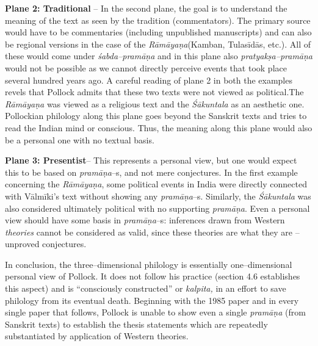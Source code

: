 \textbf{Plane 2: Traditional} – In the second plane, the goal is to understand the meaning of the text as seen by the tradition (commentators). The primary source would have to be commentaries (including unpublished manuscripts) and can also be regional versions in the case of the \textit{Rāmāyaṇa}(Kamban, Tulasīdās, etc.). All of these would come under \textit{śabda–pramāṇa} and in this plane also \textit{pratyakṣa–pramāṇa} would not be possible as we cannot directly perceive events that took place several hundred years ago. A careful reading of plane 2 in both the examples revels that Pollock admits that these two texts were not viewed as political.The \textit{Rāmāyaṇa }was viewed as a religious text and the \textit{Śākuntala} as an aesthetic one. Pollockian philology along this plane goes beyond the Sanskrit texts and tries to read the Indian mind or conscious. Thus, the meaning along this plane would also be a personal one with no textual basis.

\textbf{Plane 3: Presentist}– This represents a personal view, but one would expect this to be based on \textit{pramāṇa}–s, and not mere conjectures. In the first example concerning the \textit{Rāmāyaṇa}, some political events in India were directly connected with Vālmīki’s text without showing any \textit{pramāṇa}–s. Similarly, the \textit{Śākuntala }was also considered ultimately political with no supporting \textit{pramāṇa}. Even a personal view should have some basis in \textit{pramāṇa}–s: inferences drawn from Western \textit{theories} cannot be considered as valid, since these theories are what they are – unproved conjectures.

In conclusion, the three–dimensional philology is essentially one–dimensional personal view of Pollock. It does not follow his practice (section 4.6 establishes this aspect) and is “consciously constructed” or \textit{kalpita,} in an effort to save philology from its eventual death. Beginning with the 1985 paper and in every single paper that follows, Pollock is unable to show even a single \textit{pramāṇa }(from Sanskrit texts) to establish the thesis statements which are repeatedly substantiated by application of Western theories.

